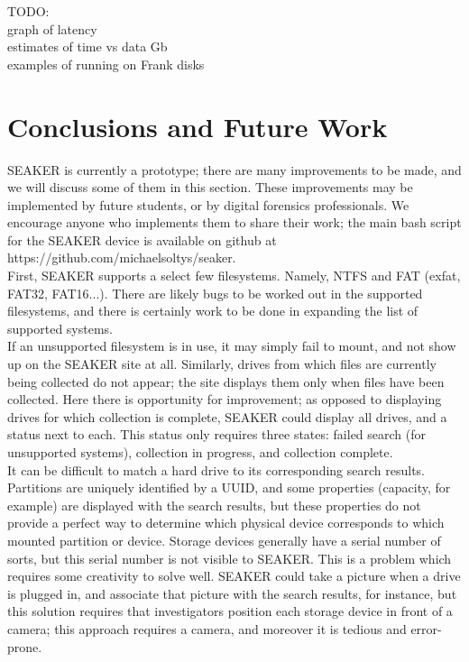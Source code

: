 \documentclass[12pt]{article}
\begin{document}
TODO:\\

graph of latency\\

estimates of time vs data Gb\\

examples of running on Frank disks\\

\section{Conclusions and Future Work}
\label{sect-conclusionAndFutureWork}

SEAKER is currently a prototype; there are many improvements to be made, and we will discuss
some of them in this section. These improvements may be implemented by future students, or by digital
forensics professionals. We encourage anyone who implements them to share their work; the main bash
script for the SEAKER device is available on github at https://github.com/michaelsoltys/seaker.\\

First, SEAKER supports a select few filesystems. Namely, NTFS and FAT (exfat, FAT32, FAT16...).
There are likely bugs to be worked out in the supported filesystems, and there is certainly work to be
done in expanding the list of supported systems.\\

If an unsupported filesystem is in use, it may simply fail to mount, and not show up on the SEAKER
site at all. Similarly, drives from which files are currently being collected do not appear; the site displays
them only when files have been collected. Here there is opportunity for improvement; as opposed to
displaying drives for which collection is complete, SEAKER could display all drives, and a status next
to each. This status only requires three states: failed search (for unsupported systems), collection in
progress, and collection complete.\\

It can be difficult to match a hard drive to its corresponding search results. Partitions are uniquely
identified by a UUID, and some properties (capacity, for example) are displayed with the search results,
but these properties do not provide a perfect way to determine which physical device corresponds to
which mounted partition or device. Storage devices generally have a serial number of sorts, but this
serial number is not visible to SEAKER. This is a problem which requires some creativity to solve well.
SEAKER could take a picture when a drive is plugged in, and associate that picture with the search
results, for instance, but this solution requires that investigators position each storage device in front of
a camera; this approach requires a camera, and moreover it is tedious and error-prone.\\
\end{document}

